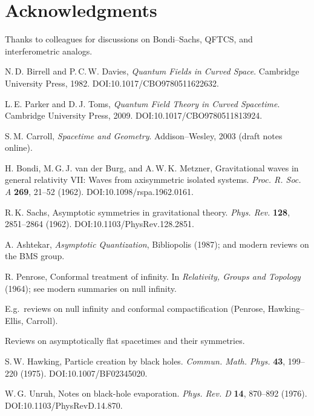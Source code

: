 \documentclass[12pt]{article}
\begin{document}
\section*{Acknowledgments}
Thanks to colleagues for discussions on Bondi--Sachs, QFTCS, and interferometric analogs.


\begin{thebibliography}{99}

N.\,D. Birrell and P.\,C.\,W. Davies,
\newblock \emph{Quantum Fields in Curved Space}.
\newblock Cambridge University Press, 1982. DOI:10.1017/CBO9780511622632. 

L.\,E. Parker and D.\,J. Toms,
\newblock \emph{Quantum Field Theory in Curved Spacetime}.
\newblock Cambridge University Press, 2009. DOI:10.1017/CBO9780511813924.

S.\,M. Carroll,
\newblock \emph{Spacetime and Geometry}.
\newblock Addison–Wesley, 2003 (draft notes online).

H. Bondi, M.\,G.\,J. van der Burg, and A.\,W.\,K. Metzner,
\newblock Gravitational waves in general relativity VII: Waves from axisymmetric isolated systems.
\newblock \emph{Proc. R. Soc. A} \textbf{269}, 21–52 (1962). DOI:10.1098/rspa.1962.0161.

R.\,K. Sachs,
\newblock Asymptotic symmetries in gravitational theory.
\newblock \emph{Phys. Rev.} \textbf{128}, 2851–2864 (1962). DOI:10.1103/PhysRev.128.2851.

A. Ashtekar, \emph{Asymptotic Quantization}, Bibliopolis (1987); and modern reviews on the BMS group.

R. Penrose,
\newblock Conformal treatment of infinity.
\newblock In \emph{Relativity, Groups and Topology} (1964); see modern summaries on null infinity.

E.g.\ reviews on null infinity and conformal compactification (Penrose, Hawking–Ellis, Carroll).

Reviews on asymptotically flat spacetimes and their symmetries.

S.\,W. Hawking,
\newblock Particle creation by black holes.
\newblock \emph{Commun. Math. Phys.} \textbf{43}, 199–220 (1975). DOI:10.1007/BF02345020.

W.\,G. Unruh,
\newblock Notes on black-hole evaporation.
\newblock \emph{Phys. Rev. D} \textbf{14}, 870–892 (1976). DOI:10.1103/PhysRevD.14.870.


\end{thebibliography}
\end{document}
